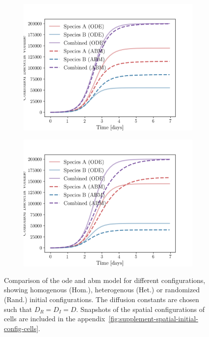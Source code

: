 \documentclass[10pt,twocolumn,5p]{elsarticle}
\numberwithin{equation}{section}
\begin{document}
\begin{figure}
\begin{subfigure}[c]{0.5\columnwidth}
    \end{subfigure}\\
    \begin{subfigure}[c]{0.5\columnwidth}
        \includegraphics[width=\columnwidth]{Figures/abm-inhomogenous/abm_ode_comparison.png}%
    \end{subfigure}%
    \begin{subfigure}[c]{0.5\columnwidth}
        \includegraphics[width=\columnwidth]{Figures/abm-random/abm_ode_comparison.png}%
    \end{subfigure}
    \caption{
        Comparison of the \ac{ode} and \ac{abm} model for different configurations, showing
        homogenous (Hom.), heterogenous (Het.) or randomized (Rand.) initial configurations.
        The diffusion constants are chosen such that $D_R=D_I=D$.
        Snapshots of the spatial configurations of cells are included in the appendix~\ref{fig:supplement-spatial-initial-config-cells}.
    }
    \label{fig:spatial-growth-curve}
\end{figure}
\end{document}
